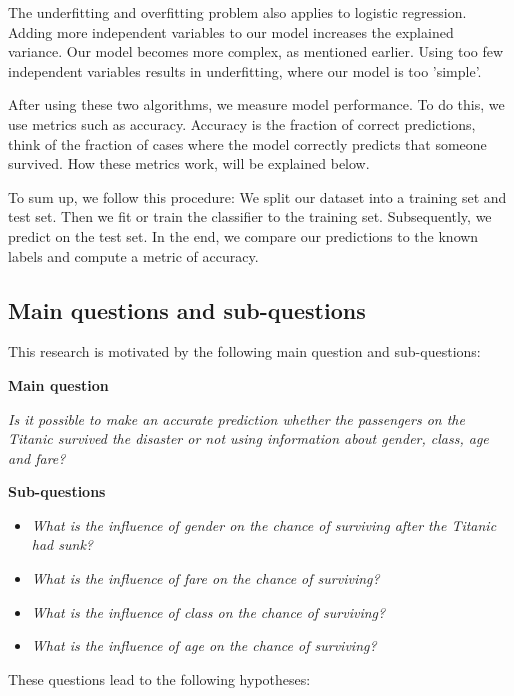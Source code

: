 \documentclass[11pt]{article}
\begin{document}
The underfitting and overfitting problem also applies to logistic regression. Adding more independent variables to our model increases the explained variance. Our model becomes more complex, as mentioned earlier. Using too few independent variables results in underfitting, where our model is too 'simple'. 

After using these two algorithms, we measure model performance. To do this, we use metrics such as accuracy. Accuracy is the fraction of correct predictions, think of the fraction of cases where the model correctly predicts that someone survived. How these metrics work, will be explained below. 

To sum up, we follow this procedure: We split our dataset into a training set and test set. Then we fit or train the classifier to the training set. Subsequently, we predict on the test set. In the end, we compare our predictions to the known labels and compute a metric of accuracy. 

\newpage

\subsection{Main questions and sub-questions}
\label{sec:org933550a}
This research is motivated by the following main question and sub-questions: 

\textbf{Main question}

\emph{Is it possible to make an accurate prediction whether the passengers on the Titanic survived the disaster or not using information about gender, class, age and fare?}

\textbf{Sub-questions} 

\begin{itemize}
\item \emph{What is the influence of gender on the chance of surviving after the Titanic had sunk?}
\item \emph{What is the influence of fare on the chance of surviving?}
\item \emph{What is the influence of class on the chance of surviving?}
\item \emph{What is the influence of age on the chance of surviving?}
\end{itemize}

These questions lead to the following hypotheses:
\end{document}
